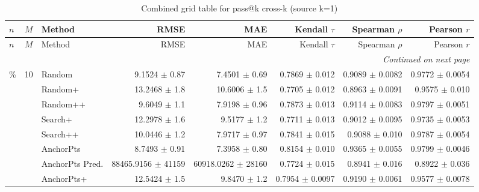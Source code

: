 \footnotesize
\setlength{\tabcolsep}{2pt}
\renewcommand{\arraystretch}{1.05}
\setlength{\LTpre}{0pt}
\setlength{\LTpost}{0pt}
\setlength{\LTleft}{\fill}
\setlength{\LTright}{\fill}
\begin{longtable}{llp{}rrrrr}
\caption{Combined grid table for pass@k cross-k (source k=1)}\label{tab:combined\_grid\_passk\_k1}\\
\toprule
$n$ & $M$ & Method & RMSE & MAE & Kendall $\tau$ & Spearman $\rho$ & Pearson $r$ \\
\midrule
\endfirsthead
\toprule
$n$ & $M$ & Method & RMSE & MAE & Kendall $\tau$ & Spearman $\rho$ & Pearson $r$ \\
\midrule
\endhead
\midrule
\multicolumn{8}{r}{\emph{Continued on next page}} \\
\midrule
\endfoot
\bottomrule
\endlastfoot
5\% & 10 & Random & 9.1524 {\scriptsize $\pm$ 0.87} & 7.4501 {\scriptsize $\pm$ 0.69} & 0.7869 {\scriptsize $\pm$ 0.012} & 0.9089 {\scriptsize $\pm$ 0.0082} & 0.9772 {\scriptsize $\pm$ 0.0054} \\
 &  & Random+ & 13.2468 {\scriptsize $\pm$ 1.8} & 10.6006 {\scriptsize $\pm$ 1.5} & 0.7705 {\scriptsize $\pm$ 0.012} & 0.8963 {\scriptsize $\pm$ 0.0091} & 0.9575 {\scriptsize $\pm$ 0.010} \\
 &  & Random++ & 9.6049 {\scriptsize $\pm$ 1.1} & 7.9198 {\scriptsize $\pm$ 0.96} & 0.7873 {\scriptsize $\pm$ 0.013} & 0.9114 {\scriptsize $\pm$ 0.0083} & 0.9797 {\scriptsize $\pm$ 0.0051} \\
 &  & Search+ & 12.2978 {\scriptsize $\pm$ 1.6} & 9.5177 {\scriptsize $\pm$ 1.2} & 0.7711 {\scriptsize $\pm$ 0.013} & 0.9012 {\scriptsize $\pm$ 0.0095} & 0.9735 {\scriptsize $\pm$ 0.0053} \\
 &  & Search++ & 10.0446 {\scriptsize $\pm$ 1.2} & 7.9717 {\scriptsize $\pm$ 0.97} & 0.7841 {\scriptsize $\pm$ 0.015} & 0.9088 {\scriptsize $\pm$ 0.010} & 0.9787 {\scriptsize $\pm$ 0.0054} \\
 &  & AnchorPts & 8.7493 {\scriptsize $\pm$ 0.91} & 7.3958 {\scriptsize $\pm$ 0.80} & 0.8154 {\scriptsize $\pm$ 0.010} & 0.9365 {\scriptsize $\pm$ 0.0055} & 0.9799 {\scriptsize $\pm$ 0.0046} \\
 &  & AnchorPts Pred. & 88465.9156 {\scriptsize $\pm$ 41159} & 60918.0262 {\scriptsize $\pm$ 28160} & 0.7724 {\scriptsize $\pm$ 0.015} & 0.8941 {\scriptsize $\pm$ 0.016} & 0.8922 {\scriptsize $\pm$ 0.036} \\
 &  & AnchorPts+ & 12.5424 {\scriptsize $\pm$ 1.5} & 9.8470 {\scriptsize $\pm$ 1.2} & 0.7954 {\scriptsize $\pm$ 0.0097} & 0.9190 {\scriptsize $\pm$ 0.0061} & 0.9577 {\scriptsize $\pm$ 0.0078} \\

\end{longtable}
